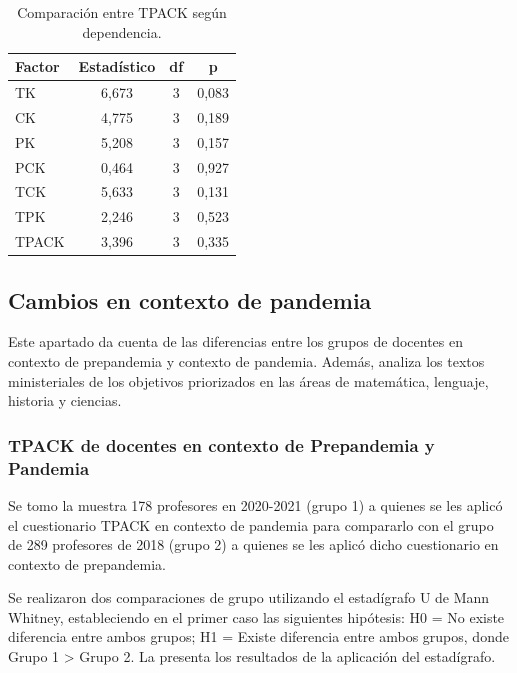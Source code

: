 \documentclass[spanish]{textolivre}
\begin{document}
\begin{table}[h!]
\centering
\begin{threeparttable}
\caption{Comparación entre TPACK según dependencia.}
\label{tab05}
\centering
\begin{tabular}{l*{3}{S}}
\toprule
Factor & {Estadístico} & {df} & {p} \\
\midrule
TK & 6,673 & 3 & 0,083 \\ 
CK & 4,775 & 3 & 0,189 \\
PK & 5,208 & 3 & 0,157 \\
PCK & 0,464 & 3 & 0,927 \\
TCK & 5,633 & 3 & 0,131 \\
TPK & 2,246 & 3 & 0,523 \\
TPACK & 3,396 & 3 & 0,335 \\
\bottomrule
\end{tabular}
\end{threeparttable}
\end{table}


\subsection{Cambios en contexto de pandemia}\label{sec-listas}
Este apartado da cuenta de las diferencias entre los grupos de docentes en contexto de prepandemia y contexto de pandemia. Además, analiza los textos ministeriales de los objetivos priorizados en las áreas de matemática, lenguaje, historia y ciencias.

\subsubsection{TPACK de docentes en contexto de Prepandemia y Pandemia }\label{sec-figuras-tabelas}
Se tomo la muestra 178 profesores en 2020-2021 (grupo 1) a quienes se les aplicó el cuestionario TPACK en contexto de pandemia para compararlo con el grupo de 289 profesores de 2018 (grupo 2) a quienes se les aplicó dicho cuestionario en contexto de prepandemia.

Se realizaron dos comparaciones de grupo utilizando el estadígrafo U de Mann Whitney, estableciendo en el primer caso las siguientes hipótesis: H0 = No existe diferencia entre ambos grupos; H1 = Existe diferencia entre ambos grupos, donde Grupo 1 > Grupo 2. La  presenta los resultados de la aplicación del estadígrafo.
\end{document}
